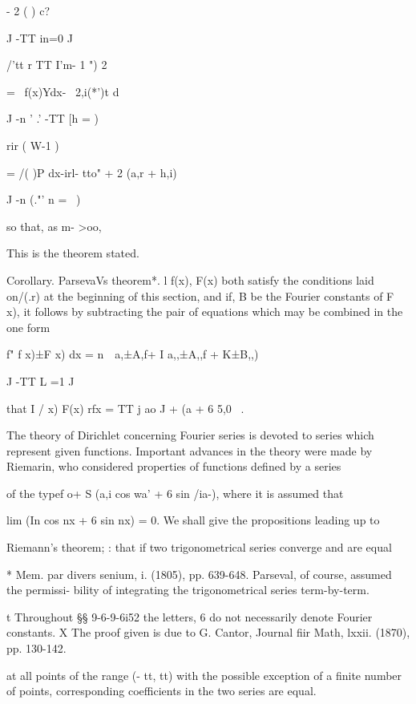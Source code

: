 - 2 ( ) c?

J -TT in=0 J

/'tt r TT I'm- 1 ") 2

 = \ f(x)Ydx- \ 2,i(*')t d

J -n ' .' -TT [h = )

rir ( W-1 )

= /( )P dx-irl- tto" + 2 (a,r + h,i) \,

J -n (."' n = \ )

so that, as m- >oo,

This is the theorem stated.

Corollary. ParsevaVs theorem*. l f(x), F(x) both satisfy the
conditions laid on/(.r) at the beginning of this section, and if, B
be the Fourier constants of F x), it follows by subtracting the pair
of equations which may be combined in the one form

f" f x)±F x) dx = n\ \ a,±A,f+ I a,,±A,,f + K±B,,) \

J -TT L =1 J

that I / x) F(x) rfx = TT j ao J + (a + 6 5,0 \ .


The theory of Dirichlet concerning Fourier series is devoted to series
which represent given functions. Important advances in the theory were
made by Riemarin, who considered properties of functions defined by a
series

of the typef o+ S (a,i cos wa' + 6 sin /ia-), where it is assumed that

lim (In cos nx + 6 sin nx) = 0. We shall give the propositions leading
up to

Riemann's theorem; : that if two trigonometrical series converge and
are equal

* Mem. par divers senium, i. (1805), pp. 639-648. Parseval, of course,
assumed the permissi- bility of integrating the trigonometrical series
term-by-term.

t Throughout §§ 9-6-9-6i52 the letters, 6 do not necessarily denote
Fourier constants. X The proof given is due to G. Cantor, Journal fiir
Math, lxxii. (1870), pp. 130-142.

%
%

at all points of the range (- tt, tt) with the possible exception of a
finite number of points, corresponding coefficients in the two series
are equal.


